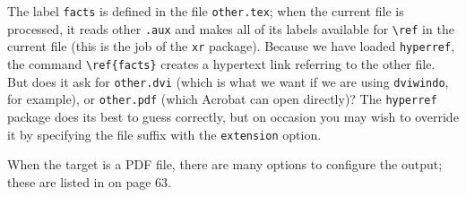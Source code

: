 The label \verb|facts| is defined in the file \verb|other.tex|; when the
current file is processed, it reads other \verb|.aux| and makes all of
its labels available for \verb|\ref| in the current file (this is the
job of the \verb|xr| package). Because we have loaded \verb|hyperref|,
the command \verb|\ref{facts}| creates a hypertext link referring to the
other file. But does it ask for \verb|other.dvi| (which is what we want
if we are using \verb|dviwindo|, for example), or \verb|other.pdf|
(which Acrobat can open directly)? The \verb|hyperref| package does its
best to guess correctly, but on occasion you may wish to override it by
specifying the file suffix with the \verb|extension| option. 


When the target is a PDF file, there are many options to configure the
output; these are listed in  on page 63. 


